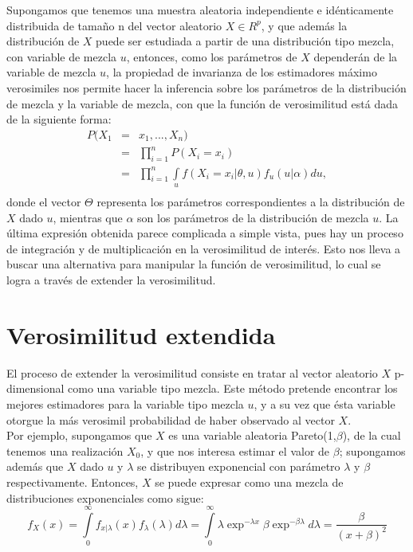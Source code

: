 Supongamos que tenemos una muestra aleatoria independiente e idénticamente distribuida de tamaño n del vector aleatorio $X\in R^{p}$, y que además la distribución de $X$ puede ser estudiada a partir de una distribución tipo mezcla, con variable de mezcla $u$, entonces, como los parámetros de $X$ dependerán de la variable de mezcla $u$, la propiedad de invarianza de los estimadores máximo verosimiles nos permite hacer la inferencia sobre los parámetros de la distribución de mezcla y la variable de mezcla, con que la función de verosimilitud está dada de la siguiente forma:
\begin{eqnarray*}
P(X_{1} &=&x_{1},..., X_{n})\\
&=&\prod_{i=1}^{n}P(X_{i}=x_{i})\\
&=&\prod_{i=1}^{n} \underset{u}{\int } f(X_{i}=x_{i}|\theta,u)f_{u}(u|\alpha)du,\\
\end{eqnarray*}
donde el vector $\Theta$ representa los parámetros correspondientes a la distribución de $X$ dado $u$, mientras que $\alpha$
son los parámetros de la distribución de mezcla $u$.
La última expresión obtenida parece complicada a simple vista, pues hay un proceso de integración y de multiplicación en la verosimilitud de interés. Esto nos lleva a buscar una alternativa para manipular la función de verosimilitud, lo cual se logra a través de extender la verosimilitud.

\section{Verosimilitud extendida}

El proceso de extender la verosimilitud consiste en tratar al vector aleatorio $X$ p-dimensional como una variable tipo mezcla. Este método pretende encontrar los mejores estimadores para la variable tipo mezcla $u$, y a su vez que ésta variable otorgue la más verosimil probabilidad de haber observado al vector $X$.\\ 

Por ejemplo, supongamos que $X$ es una variable aleatoria Pareto(1,$\beta$), de la cual tenemos  una realización $X_{0} $, y que nos interesa estimar el valor de $ \beta$; supongamos además que $X$ dado $u$ y $\lambda$ se distribuyen exponencial con parámetro $\lambda$ y $\beta$ respectivamente. Entonces, $X$ se puede expresar como una mezcla de distribuciones exponenciales como sigue:\\
\begin{equation*}
f_{X}(x)=\underset{0}{\overset{\infty }{\int }}f_{x|\lambda}(x)f_{\lambda}(\lambda)d\lambda=\underset{0}{\overset{\infty }{\int }} \lambda \exp^{-\lambda x} \beta \exp^{-\beta \lambda} d\lambda=\dfrac{\beta}{(x+\beta)^{2}}
\end{equation*}


